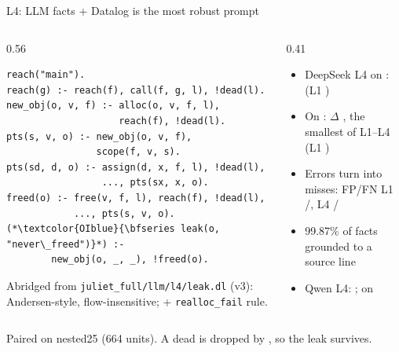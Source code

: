 \begin{frame}[fragile]{L4: LLM facts + Datalog is the most robust prompt}
  \begin{columns}[T]
    \begin{column}{0.56\textwidth}
\begin{lstlisting}[style=dl]
reach("main").
reach(g) :- reach(f), call(f, g, l), !dead(l).
new_obj(o, v, f) :- alloc(o, v, f, l),
                    reach(f), !dead(l).
pts(s, v, o) :- new_obj(o, v, f),
                scope(f, v, s).
pts(sd, d, o) :- assign(d, x, f, l), !dead(l),
                 ..., pts(sx, x, o).
freed(o) :- free(v, f, l), reach(f), !dead(l),
            ..., pts(s, v, o).
(*\textcolor{OIblue}{\bfseries leak(o, "never\_freed")}*) :-
        new_obj(o, _, _), !freed(o).
\end{lstlisting}
      {\tiny Abridged from \texttt{juliet\_full/llm/l4/leak.dl} (v3): Andersen-style, flow-insensitive;
      + \texttt{realloc\_fail} rule.\par}
    \end{column}
    \begin{column}{0.41\textwidth}
      \begin{itemize}\small
        \item DeepSeek L4 on :  (L1 )
        \item On : $\Delta$ , the smallest of L1--L4 (L1 )
        \item Errors turn into misses: FP/FN L1 /,
              L4 /
        \item 99.87\% of facts grounded to a source line
        \item Qwen L4: ; on  
      \end{itemize}
    \end{column}
  \end{columns}
  \vfill
  {\scriptsize Paired on nested25 (664 units). A dead  is dropped by , so the leak survives.\par}
\end{frame}
